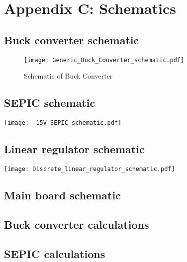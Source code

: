 \chapter*{Appendix C: Schematics}
\label{chap:appendix-C-schematics}

\section*{Buck converter schematic} \label{Appendix_buck_schematic}
\begin{figure}[ht]  
    \texttt{[image: Generic\_Buck\_Converter\_schematic.pdf]}
    \caption{Schematic of Buck Converter}
    \label{fig:buck-schematic}
\end{figure}

\section*{SEPIC schematic} \label{Appendix_SEPIC_schematic}
\texttt{[image: -15V\_SEPIC\_schematic.pdf]}

\section*{Linear regulator schematic}\label{Appendix_lin_schematic}
\texttt{[image: Discrete\_linear\_regulator\_schematic.pdf]}

\section*{Main board schematic} \label{Appendix_main_schematic}


\section*{Buck converter calculations} \label{Appendix_buck_calculations}


\section*{SEPIC calculations} \label{Appendix_SEPIC_calculations}

